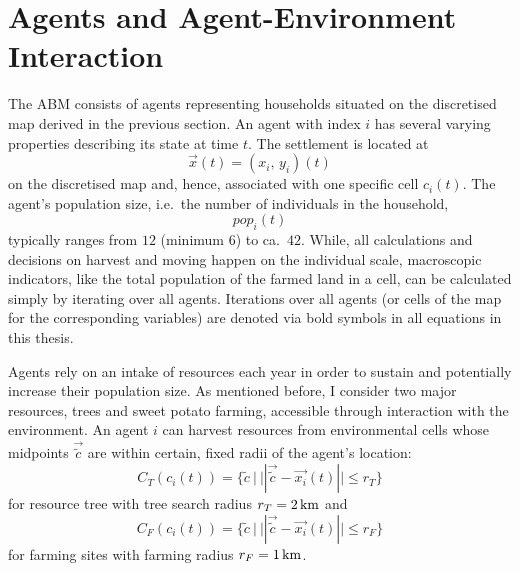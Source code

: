 \section{Agents and Agent-Environment Interaction}\label{sec:AgentUpdate}
The ABM consists of agents representing households situated on the discretised map derived in the previous section.
An agent with index $i$ has several varying properties describing its state at time $t$.
The settlement is located at 
\begin{equation}
	\vec{x}(t) = (x_i,\, y_i)(t)
\end{equation}
 on the discretised map and, hence, associated with one specific cell $c_i(t)$.
 The agent's population size, i.e.\ the number of individuals in the household, 
 \begin{equation}pop_i(t) \end{equation}
 typically ranges from $12$ (minimum $6$) to ca.\ $42$.%
While, all calculations and decisions on harvest and moving happen on the individual scale, macroscopic indicators, like the total population of the farmed land in a cell, can be calculated simply by iterating over all agents. 
Iterations over all agents (or cells of the map for the corresponding variables) are denoted via bold symbols in all equations in this thesis.

Agents rely on an intake of resources each year in order to sustain and potentially increase their population size.
As mentioned before, I consider two major resources, trees and sweet potato farming, accessible through interaction with the environment.
An agent $i$ can harvest resources from environmental cells whose midpoints $\vec{\tilde{c}}$ are within certain, fixed radii of the agent's location:
\begin{equation} \label{eq:Circle_T}
C_{T}(c_i(t)) = \{ \tilde{c}\ | \   | |  \vec{\tilde{c}} - \vec{x_i}(t) | |  \leq r_{T} \} 
\end{equation}
for resource tree with tree search radius $r_T =2\, {\rm km}$ and 
\begin{equation} \label{eq:Circle_F}
C_{F}(c_i(t)) = \{ \tilde{c}\ | \   | |  \vec{\tilde{c}} - \vec{x_i}(t) | |  \leq r_{F} \}
\end{equation}
for farming sites with farming radius $r_F = 1\, {\rm km}$.

